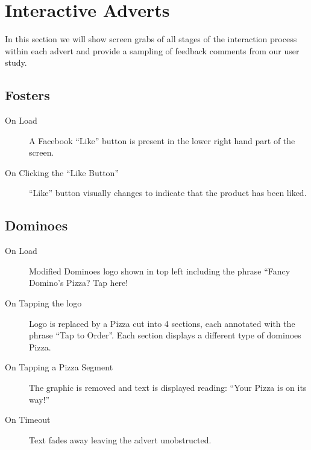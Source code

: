 \section{Interactive Adverts}
In this section we will show screen grabs of all stages of the interaction process within each advert and provide a sampling of feedback comments from our user study.

\subsection{Fosters}
	\begin{description}
		\item[On Load]{A Facebook ``Like'' button is present in the lower right hand part of the screen.}
		\item[On Clicking the ``Like Button'']{``Like'' button visually changes to indicate that the product has been liked.}
	\end{description}
\subsection{Dominoes}
	\begin{description}
		\item[On Load]{Modified Dominoes logo shown in top left including the phrase ``Fancy Domino's Pizza? Tap here!}
		\item[On Tapping the logo]{Logo is replaced by a Pizza cut into 4 sections, each annotated with the phrase ``Tap to Order''. Each section displays a different type of dominoes Pizza.}
		\item[On Tapping a Pizza Segment]{The graphic is removed and text is displayed reading: ``Your Pizza is on its way!''}
		\item[On Timeout]{Text fades away leaving the advert unobstructed.}
	\end{description}
